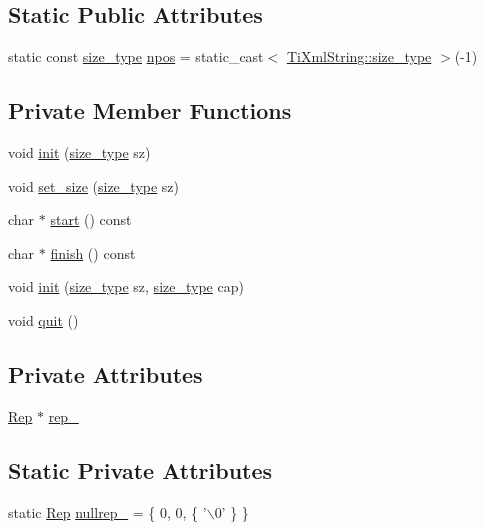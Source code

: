 \subsection*{Static Public Attributes}
\begin{DoxyCompactItemize}
\item 
static const \hyperlink{classTiXmlString_abeb2c1893a04c17904f7c06546d0b971}{size\_\-type} \hyperlink{classTiXmlString_a8f4422d227088dc7bec96f479b275d0a}{npos} = static\_\-cast$<$ \hyperlink{classTiXmlString_abeb2c1893a04c17904f7c06546d0b971}{TiXmlString::size\_\-type} $>$(-\/1)
\end{DoxyCompactItemize}
\subsection*{Private Member Functions}
\begin{DoxyCompactItemize}
\item 
void \hyperlink{classTiXmlString_a694eacb51c43d8eba8aa7d4552b598ff}{init} (\hyperlink{classTiXmlString_abeb2c1893a04c17904f7c06546d0b971}{size\_\-type} sz)
\item 
void \hyperlink{classTiXmlString_a5d70615367bf2920c25feddf6ac4ad30}{set\_\-size} (\hyperlink{classTiXmlString_abeb2c1893a04c17904f7c06546d0b971}{size\_\-type} sz)
\item 
char $\ast$ \hyperlink{classTiXmlString_a36417caceebe25352f53a87e8cd966b4}{start} () const 
\item 
char $\ast$ \hyperlink{classTiXmlString_a58faf1c6b9828c8d5d5092bebf146167}{finish} () const 
\item 
void \hyperlink{classTiXmlString_ae11cd23e090fd2e7bb62eda05b45a2d6}{init} (\hyperlink{classTiXmlString_abeb2c1893a04c17904f7c06546d0b971}{size\_\-type} sz, \hyperlink{classTiXmlString_abeb2c1893a04c17904f7c06546d0b971}{size\_\-type} cap)
\item 
void \hyperlink{classTiXmlString_aa6008ae51286a342cd366fbf1e3eeafc}{quit} ()
\end{DoxyCompactItemize}
\subsection*{Private Attributes}
\begin{DoxyCompactItemize}
\item 
\hyperlink{structTiXmlString_1_1Rep}{Rep} $\ast$ \hyperlink{classTiXmlString_ac7be48f31ca451bcb16de428b5c40e0c}{rep\_\-}
\end{DoxyCompactItemize}
\subsection*{Static Private Attributes}
\begin{DoxyCompactItemize}
\item 
static \hyperlink{structTiXmlString_1_1Rep}{Rep} \hyperlink{classTiXmlString_ae1f9e0de28328eed27d5623ff67a3191}{nullrep\_\-} = \{ 0, 0, \{ '$\backslash$0' \} \}
\end{DoxyCompactItemize}



